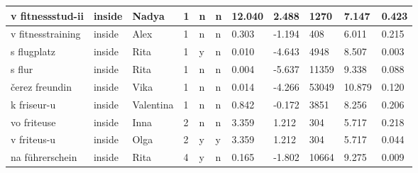 \begin{longtable}{|p{4cm}|p{1cm}|p{1.2cm}|p{0.5cm}|p{0.5cm}|p{0.5cm}|R{1cm}|R{1cm}|R{1cm}|R{1cm}|R{1cm}|}
v fitnessstud-ii           & inside            & Nadya         & 1                                   & n                          & n                          & 12.040     & 2.488         & 1270                    & 7.147                         & 0.423                   \\ \hline
v fitnesstraining          & inside            & Alex          & 1                                   & n                          & n                          & 0.303      & -1.194        & 408                     & 6.011                         & 0.215                   \\ \hline
s flugplatz                & inside            & Rita          & 1                                   & y                          & n                          & 0.010      & -4.643        & 4948                    & 8.507                         & 0.003                   \\ \hline
s flur                     & inside            & Rita          & 1                                   & n                          & n                          & 0.004      & -5.637        & 11359                   & 9.338                         & 0.088                   \\ \hline
\v{c}erez freundin         & inside            & Vika          & 1                                   & n                          & n                          & 0.014      & -4.266        & 53049                   & 10.879                        & 0.120                   \\ \hline
k friseur-u                & inside            & Valentina     & 1                                   & n                          & n                          & 0.842      & -0.172        & 3851                    & 8.256                         & 0.206                   \\ \hline
vo friteuse                & inside            & Inna          & 2                                   & n                          & n                          & 3.359      & 1.212         & 304                     & 5.717                         & 0.218                   \\ \hline
v friteus-u                & inside            & Olga          & 2                                   & y                          & y                          & 3.359      & 1.212         & 304                     & 5.717                         & 0.044                   \\ \hline
na f\"{u}hrerschein        & inside            & Rita          & 4                                   & y                          & n                          & 0.165      & -1.802        & 10664                   & 9.275                         & 0.009                   \\ \hline

\end{longtable}
